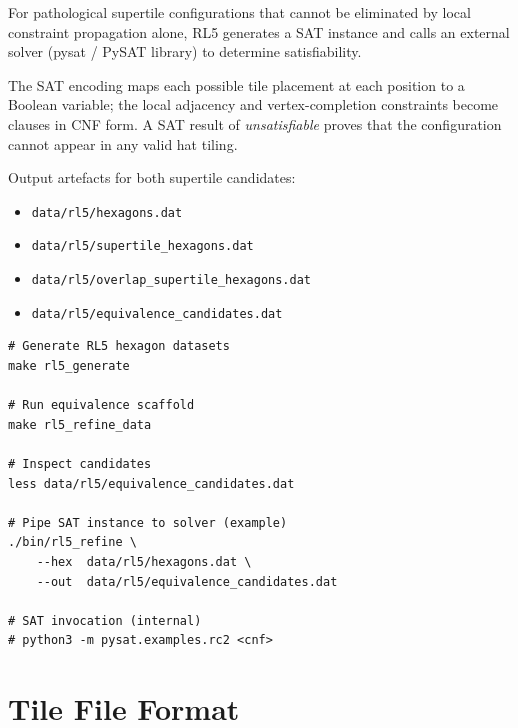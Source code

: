 \documentclass[10pt,a4paper]{article}
\let\polysection\section
\renewcommand\section{\needspace{0.16\textheight}\polysection}
\newcommand{\file}[1]{\texttt{\footnotesize #1}}
\begin{document}
\begin{tcolorbox}[dualbox, title=RL5 — SAT Verification — \file{src/rl5/sat5.c}]
  For pathological supertile configurations that cannot be eliminated
  by local constraint propagation alone, RL5 generates a SAT instance
  and calls an external solver (pysat / PySAT library) to determine
  satisfiability.

  The SAT encoding maps each possible tile placement at each position
  to a Boolean variable; the local adjacency and vertex-completion
  constraints become clauses in CNF form.  A SAT result of
  \emph{unsatisfiable} proves that the configuration cannot appear in
  any valid hat tiling.

  Output artefacts for both supertile candidates:
  \begin{itemize}
    \item \file{data/rl5/hexagons.dat}
    \item \file{data/rl5/supertile\_hexagons.dat}
    \item \file{data/rl5/overlap\_supertile\_hexagons.dat}
    \item \file{data/rl5/equivalence\_candidates.dat}
  \end{itemize}
\tcblower
\begin{verbatim}
# Generate RL5 hexagon datasets
make rl5_generate

# Run equivalence scaffold
make rl5_refine_data

# Inspect candidates
less data/rl5/equivalence_candidates.dat

# Pipe SAT instance to solver (example)
./bin/rl5_refine \
    --hex  data/rl5/hexagons.dat \
    --out  data/rl5/equivalence_candidates.dat

# SAT invocation (internal)
# python3 -m pysat.examples.rc2 <cnf>
\end{verbatim}
\end{tcolorbox}

\section{Tile File Format}
\end{document}
